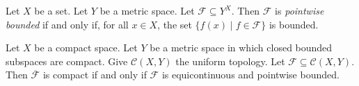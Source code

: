 \begin{definition}
    Let $X$ be a set. Let $Y$ be a metric space. Let $\mathcal{F} \subseteq Y^X$. Then $\mathcal{F}$ is \emph{pointwise bounded}
    if and only if, for all $x \in X$, the set $\{ f(x) \mid f \in \mathcal{F} \}$ is bounded.
\end{definition}

\begin{theorem}
    Let $X$ be a compact space. Let $Y$ be a metric space in which closed bounded subspaces are compact. 
    Give $\mathcal{C}(X, Y)$ the uniform topology.
    Let $\mathcal{F} \subseteq \mathcal{C}(X, Y)$. Then $\overline{\mathcal{F}}$ is compact if and only if
    $\mathcal{F}$ is equicontinuous and pointwise bounded.
\end{theorem}

